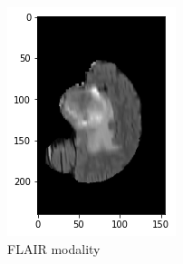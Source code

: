 \begin{figure}[H]
\begin{subfigure}[t]{.2\textwidth}
        \includegraphics[width=\linewidth]{chapters/04_segmentation/images/brats/3.png}
        \caption{FLAIR modality}
    \end{subfigure}%
    \begin{subfigure}[t]{.2\textwidth}
        \centering

\end{subfigure}
\end{figure}
